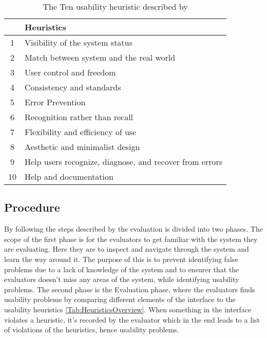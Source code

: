 \begin{table}
	\centering
\begin{tabular}[width=\textwidth]{cl}
\hline
& \textbf{Heuristics \parencite{WEB:Nielsen1994Ten} }\\ \hline
1 & Visibility of the system status \\ 
2 & Match between system and the real world \\ 
3 & User control and freedom \\ 
4 & Consistency and standards \\ 
5 & Error Prevention \\ 
6 & Recognition rather than recall \\ 
7 & Flexibility and efficiency of use \\ 
8 & Aesthetic and minimalist design \\ 
9 & Help users recognize, diagnose, and recover from errors \\ 
10 & Help and documentation \\ \hline
\end{tabular}
\caption{The Ten usability heuristic described by \textcite{WEB:Nielsen1994Ten}}
\label{Tab:HeuristicsOverview}
\end{table}

\subsection{Procedure}
\label{HeuristicProcedure}
By following the steps described by \textcite{WEB:Nielsen1994HowTo} the evaluation is divided into two phases. The scope of the first phase is for the evaluators to get familiar with the system they are evaluating. Here they are to inspect and navigate through the system and learn the way around it. The purpose of this is to prevent identifying false problems due to a lack of knowledge of the system and to ensurer that the evaluators doesn't miss any areas of the system, while identifying usability problems. The second phase is the Evaluation phase, where the evaluators finds usability problems by comparing different elements of the interface to the usability heuristics \autoref{Tab:HeuristicsOverview}. When something in the interface violates a heuristic, it's recorded by the evaluator which in the end leads to a list of violations of the heuristics, hence usability problems. 


